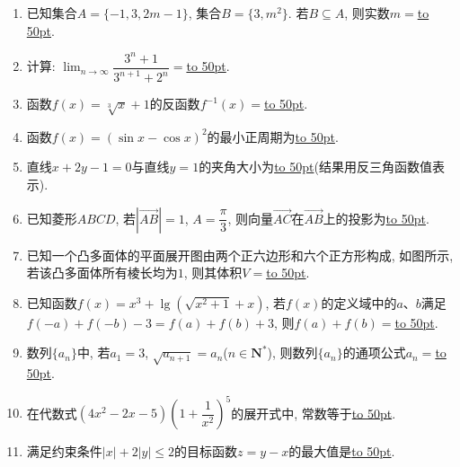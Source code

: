 \documentclass[10pt,a4paper]{article}
\newcommand{\blank}[1]{\underline{\hbox to #1pt{}}}
\begin{document}
\begin{enumerate}[1.]
\item 已知集合$A=\{-1,3,2m-1\}$, 集合$B=\{3,m^2\}$. 若$B\subseteq A$, 则实数$m=$\blank{50}.
\item 计算: $\displaystyle\lim_{n\to\infty}\dfrac{3^n+1}{3^{n+1}+2^n}=$\blank{50}.
\item 函数$f(x)=\sqrt[3]x+1$的反函数$f^{-1}(x)=$\blank{50}.
\item 函数$f(x)=(\sin x-\cos x)^2$的最小正周期为\blank{50}.
\item 直线$x+2y-1=0$与直线$y=1$的夹角大小为\blank{50}(结果用反三角函数值表示).
\item 已知菱形$ABCD$, 若$|\overrightarrow{AB}|=1$, $A=\dfrac\pi 3$, 则向量$\overrightarrow{AC}$在$\overrightarrow{AB}$上的投影为\blank{50}.
\item 已知一个凸多面体的平面展开图由两个正六边形和六个正方形构成, 如图所示, 若该凸多面体所有棱长均为$1$, 则其体积$V=$\blank{50}.
\begin{center}
\end{center}
\item 已知函数$f(x)={x^3}+\lg (\sqrt{x^2+1}+x)$, 若$f(x)$的定义域中的$a$、$b$满足$f(-a)+f(-b)-3=f(a)+f(b)+3$, 则$f(a)+f(b)=$\blank{50}.
\item 数列$\{a_n\}$中, 若$a_1=3$, $\sqrt{a_{n+1}}=a_n$($n\in \mathbf{N}^*$), 则数列$\{a_n\}$的通项公式$a_n=$\blank{50}.
\item 在代数式$(4x^2-2x-5)(1+\dfrac1{x^2})^5$的展开式中, 常数等于\blank{50}.
\item 满足约束条件$|x|+2|y|\le 2 $的目标函数$z=y-x$的最大值是\blank{50}.


\end{enumerate}
\end{document}
